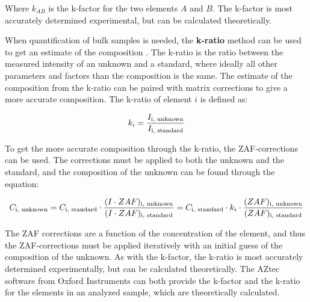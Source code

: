 Where $k_{AB}$ is the k-factor for the two elements $A$ and $B$.
The k-factor is most accurately determined experimental, but can be calculated theoretically.


When quantification of bulk samples is needed, the \textbf{k-ratio} method can be used to get an estimate of the composition \cite[Ch. 19.1]{goldstein_scanning_2018}.
The k-ratio is the ratio between the measured intensity of an unknown and a standard, where ideally all other parameters and factors than the composition is the same.
The estimate of the composition from the k-ratio can be paired with matrix corrections to give a more accurate composition.
The k-ratio of element $i$ is defined as:

\begin{equation}
    \label{eq:theory:quantitative:k_ratio}
    k_i = \frac{I_\textnormal{i, unknown}}{I_\textnormal{i, standard}}
\end{equation}


To get the more accurate composition through the k-ratio, the ZAF-corrections can be used.
The corrections must be applied to both the unknown and the standard, and the composition of the unknown can be found through the equation:

\begin{equation}
    \label{eq:theory:quantitative:k_ratio_ZAF}
    C_\textnormal{i, unknown} = C_\textnormal{i, standard} \cdot  \frac{(I \cdot ZAF)_\textnormal{i, unknown}}{(I \cdot ZAF)_\textnormal{i, standard}} = C_\textnormal{i, standard} \cdot k_i \cdot \frac{(ZAF)_\textnormal{i, unknown}}{(ZAF)_\textnormal{i, standard}}
\end{equation}

The ZAF corrections are a function of the concentration of the element, and thus the ZAF-corrections must be applied iteratively with an initial guess of the composition of the unknown.
As with the k-factor, the k-ratio is most accurately determined experimentally, but can be calculated theoretically.
The AZtec software from Oxford Instruments \cite{aztec_manual} can both provide the k-factor and the k-ratio for the elements in an analyzed sample, which are theoretically calculated.










